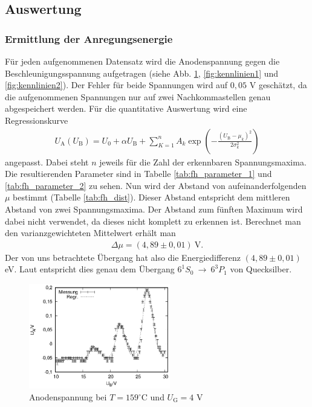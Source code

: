 \subsection{Auswertung}
\subsubsection{Ermittlung der Anregungsenergie}
Für jeden aufgenommenen Datensatz wird die Anodenspannung gegen die Beschleunigungsspannung aufgetragen (siehe Abb. \ref{fig:159K4V}, \ref{fig:kennlinien1} und \ref{fig:kennlinien2}). Der Fehler für beide Spannungen wird auf $0,05$ V geschätzt, da die aufgenommenen Spannungen nur auf zwei Nachkommastellen genau abgespeichert werden. Für die quantitative Auswertung wird eine Regressionskurve
\begin{align*}
  U_\mathrm{A}(U_\mathrm{B})=U_0+\alpha U_\mathrm{B}+\sum_{K=1}^nA_k\exp \left(-\frac{(U_\mathrm{B}-\mu_k)^2}{2\sigma_k^2} \right)
\end{align*}
angepasst. Dabei steht $n$ jeweils für die Zahl der erkennbaren Spannungsmaxima. Die resultierenden Parameter sind in Tabelle \ref{tab:fh_parameter_1} und \ref{tab:fh_parameter_2} zu sehen. Nun wird der Abstand von aufeinanderfolgenden $\mu$ bestimmt (Tabelle \ref{tab:fh_dist}). Dieser Abstand entspricht dem mittleren Abstand von zwei Spannungsmaxima. Der Abstand zum fünften Maximum wird dabei nicht verwendet, da dieses nicht komplett zu erkennen ist. Berechnet man den varianzgewichteten Mittelwert erhält man 
\begin{align*}
  \Delta \mu=(4,89 \pm 0,01)\mathrm{\ V.}
\end{align*}
Der von uns betrachtete Übergang hat also die Energiedifferenz $(4,89 \pm 0,01)$ eV.
Laut \cite{praktikumsheft} entspricht dies genau dem Übergang $6^1S_0 \ \rightarrow \ 6^3P_1$ von Quecksilber.

\begin{figure}[!h]
  \centering
  \includegraphics[width=0.55\textwidth]{data/fh/159K4V.eps}
  \caption{Anodenspannung bei $T=159^\circ$C und $U_\mathrm{G}=4$ V}
  \label{fig:159K4V}
\end{figure}


